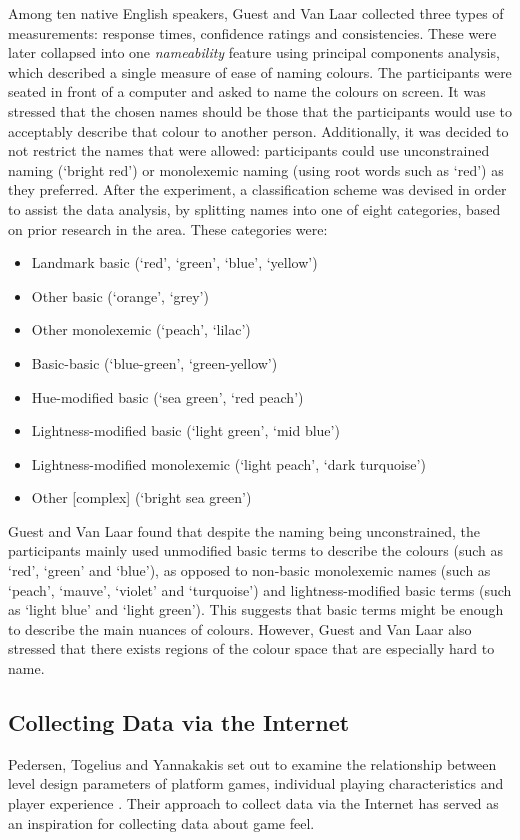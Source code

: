 Among ten native English speakers, Guest and Van Laar collected three types of measurements: response times, confidence ratings and consistencies. These were later collapsed into one \textit{nameability} feature using principal components analysis, which described a single measure of ease of naming colours. The participants were seated in front of a computer and asked to name the colours on screen. It was stressed that the chosen names should be those that the participants would use to acceptably describe that colour to another person. Additionally, it was decided to not restrict the names that were allowed: participants could use unconstrained naming (`bright red') or monolexemic naming (using root words such as `red') as they preferred. After the experiment, a classification scheme was devised in order to assist the data analysis, by splitting names into one of eight categories, based on prior research in the area. These categories were:
\begin{itemize}[noitemsep,nolistsep]
\item Landmark basic (`red', `green', `blue', `yellow')
\item Other basic (`orange', `grey')
\item Other monolexemic (`peach', `lilac')
\item Basic-basic (`blue-green', `green-yellow')
\item Hue-modified basic (`sea green', `red peach')
\item Lightness-modified basic (`light green', `mid blue')
\item Lightness-modified monolexemic (`light peach', `dark turquoise')
\item Other [complex] (`bright sea green')
\end{itemize}
Guest and Van Laar found that despite the naming being unconstrained, the participants mainly used unmodified basic terms to describe the colours (such as `red', `green' and `blue'), as opposed to non-basic monolexemic names (such as `peach', `mauve', `violet' and `turquoise') and lightness-modified basic terms (such as `light blue' and `light green'). This suggests that basic terms might be enough to describe the main nuances of colours. However, Guest and Van Laar also stressed that there exists regions of the colour space that are especially hard to name.

\subsection{Collecting Data via the Internet} \label{marioLevel}
Pedersen, Togelius and Yannakakis set out to examine the relationship between level design parameters of platform games, individual playing characteristics and player experience \cite{marioModel}. Their approach to collect data via the Internet has served as an inspiration for collecting data about game feel.

